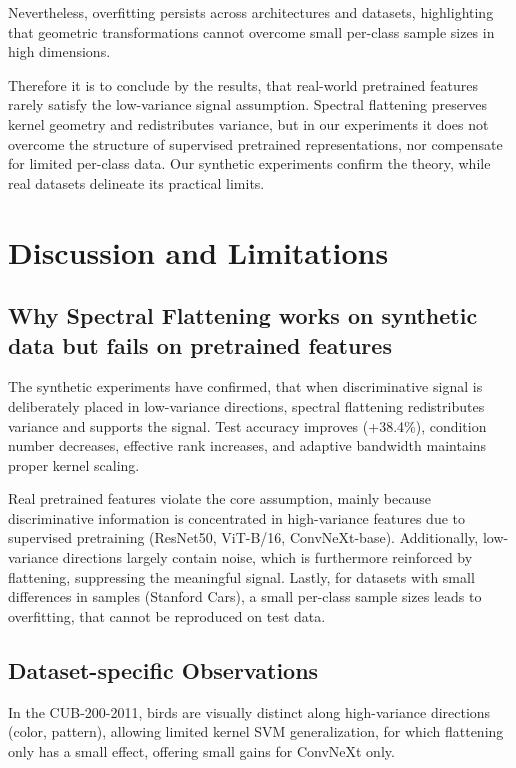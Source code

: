 \documentclass{article}
\begin{document}
Nevertheless, overfitting persists across architectures and datasets, highlighting that geometric transformations cannot overcome small per-class sample sizes in high dimensions.

Therefore it is to conclude by the results, that real-world pretrained features rarely satisfy the low-variance signal assumption. Spectral flattening preserves kernel geometry and redistributes variance, but in our experiments it does not overcome the structure of supervised pretrained representations, nor compensate for limited per-class data. Our synthetic experiments confirm the theory, while real datasets delineate its practical limits.

\section{Discussion and Limitations}

\subsection{Why Spectral Flattening works on synthetic data but fails on pretrained features}

The synthetic experiments have confirmed, that when discriminative signal is deliberately placed in low-variance directions, spectral flattening redistributes variance and supports the signal. Test accuracy improves (+38.4\%), condition number decreases, effective rank increases, and adaptive bandwidth maintains proper kernel scaling.

Real pretrained features violate the core assumption, mainly because discriminative information is concentrated in high-variance features due to supervised pretraining (ResNet50, ViT-B/16, ConvNeXt-base). Additionally, low-variance directions largely contain noise, which is furthermore reinforced by flattening, suppressing the meaningful signal. Lastly, for datasets with small differences in samples (Stanford Cars), a small per-class sample sizes leads to overfitting, that cannot be reproduced on test data.

\subsection{Dataset-specific Observations}

In the CUB-200-2011, birds are visually distinct along high-variance directions (color, pattern), allowing limited kernel SVM generalization, for which flattening only has a small effect, offering small gains for ConvNeXt only.
\end{document}
